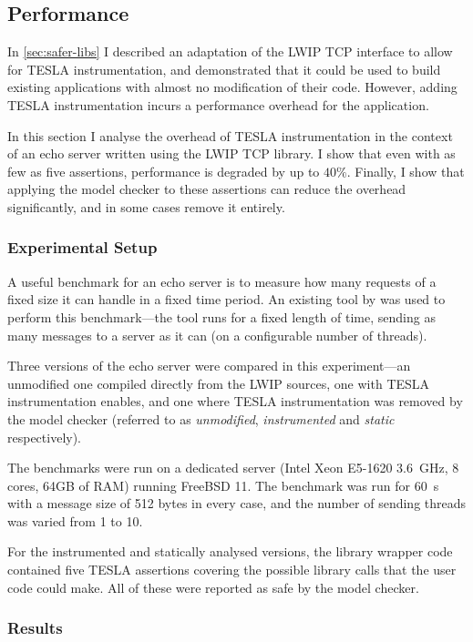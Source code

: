 \subsection{Performance} \label{sec:eval-perf}

In \autoref{sec:safer-libs} I described an adaptation of the LWIP TCP interface
to allow for TESLA instrumentation, and demonstrated that it could be used to
build existing applications with almost no modification of their code. However,
adding TESLA instrumentation incurs a performance overhead for the application.

In this section I analyse the overhead of TESLA instrumentation in the context
of an echo server written using the LWIP TCP library. I show that even with as
few as five assertions, performance is degraded by up to $40\%$. Finally, I show
that applying the model checker to these assertions can reduce the overhead
significantly, and in some cases remove it entirely.

\subsubsection{Experimental Setup}

A useful benchmark for an echo server is to measure how many requests of a fixed
size it can handle in a fixed time period. An existing tool by
\textcite{hoyer_rust_2016} was used to perform this benchmark---the tool runs
for a fixed length of time, sending as many messages to a server as it can (on a
configurable number of threads).

Three versions of the echo server were compared in this experiment---an
unmodified one compiled directly from the LWIP sources, one with TESLA
instrumentation enables, and one where TESLA instrumentation was removed by the
model checker (referred to as \emph{unmodified}, \emph{instrumented} and
\emph{static} respectively).

The benchmarks were run on a dedicated server (Intel Xeon E5-1620
\SI{3.6}{\GHz}, 8 cores, 64GB of RAM) running FreeBSD 11. The benchmark was run
for \SI{60}{\s} with a message size of 512 bytes in every case, and the number
of sending threads was varied from 1 to 10.

For the instrumented and statically analysed versions, the library wrapper code
contained five TESLA assertions covering the possible library calls that the
user code could make. All of these were reported as safe by the model checker.

\subsubsection{Results}

